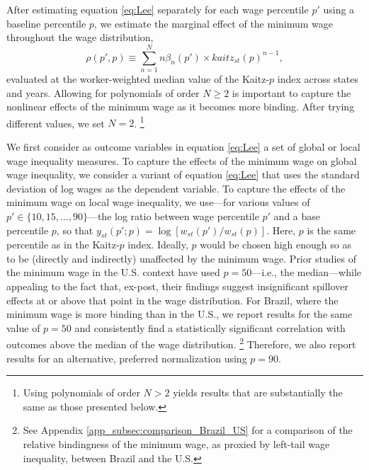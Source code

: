 After estimating equation \eqref{eq:Lee} separately for each wage percentile $p'$ using a baseline percentile $p$, we estimate the marginal effect of the minimum wage throughout the wage distribution,
%
\begin{equation}
    \rho(p',p) \equiv \sum_{n=1}^{N}n\beta_{n}(p') \times kaitz_{st}(p)^{n-1},\label{eq:Lee_marginal_effect}
\end{equation}
%
evaluated at the worker-weighted median value of the Kaitz-$p$ index across states and years. Allowing for polynomials of order $N \ge 2$ is important to capture the nonlinear effects of the minimum wage as it becomes more binding. After trying different values, we set $N=2$.%
%
\footnote{Using polynomials of order $N>2$ yields results that are substantially the same as those presented below.} %
%

We first consider as outcome variables in equation \eqref{eq:Lee} a set of global or local wage inequality measures. To capture the effects of the minimum wage on global wage inequality, we consider a variant of equation \eqref{eq:Lee} that uses the standard deviation of log wages as the dependent variable. To capture the effects of the minimum wage on local wage inequality, we use---for various values of $p' \in \{ 10, 15, \ldots, 90 \}$---the log ratio between wage percentile $p'$ and a base percentile $p$, so that $y_{st}(p';p)=\log [ w_{st}(p') / w_{st}(p) ]$. Here, $p$ is the same percentile as in the Kaitz-$p$ index. Ideally, $p$ would be chosen high enough so as to be (directly and indirectly) unaffected by the minimum wage. Prior studies of the minimum wage in the U.S. context have used $p=50$---i.e., the median---while appealing to the fact that, ex-post, their findings suggest insignificant spillover effects at or above that point in the wage distribution. For Brazil, where the minimum wage is more binding than in the U.S., we report results for the same value of $p=50$ and consistently find a statistically significant correlation with outcomes above the median of the wage distribution.%
%
\footnote{See Appendix \ref{app_subsec:comparison_Brazil_US} for a comparison of the relative bindingness of the minimum wage, as proxied by left-tail wage inequality, between Brazil and the U.S.} %
%
Therefore, we also report results for an alternative, preferred normalization using $p=90$.

